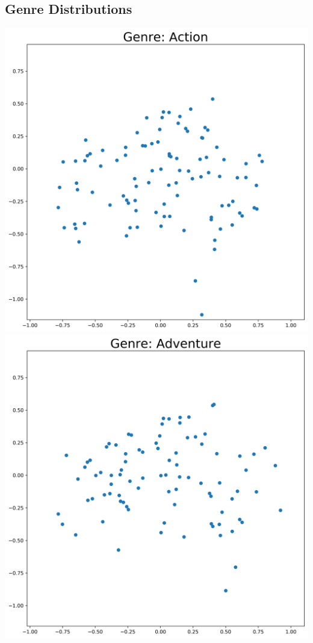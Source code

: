 \begin{appendices}
\begin{center}
\begin{minipage}{0.48\linewidth}
\captionsetup{width=.85\linewidth}
\end{minipage}
\end{center} 

\pagebreak
\subsection{Genre Distributions}
\label{appendix:viz-Genres}
\includegraphics[scale=0.26]{"genres/Genre: Action"}
\includegraphics[scale=0.26]{"genres/Genre: Adventure"}

\end{appendices}
